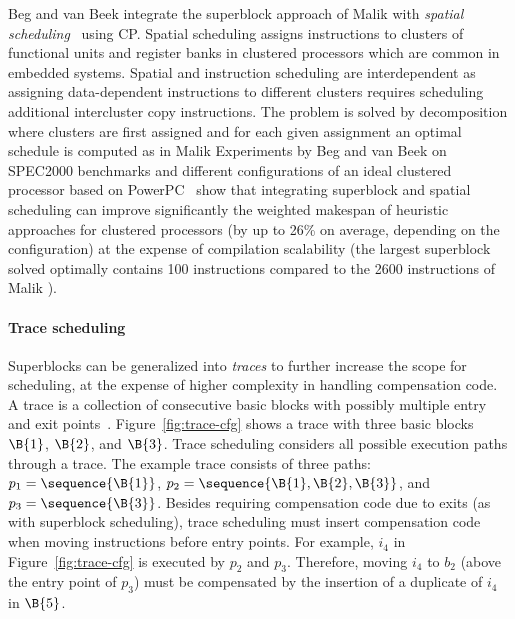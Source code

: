 \documentclass[acmsmall,authorversion,nonacm]{acmart}
\begin{document}
Beg and van Beek integrate the superblock approach of Malik \etal{}
with \emph{spatial scheduling}~\cite{Beg2013} using CP.
Spatial scheduling assigns instructions to clusters of functional
units and register banks in clustered processors which are common in
embedded systems.
Spatial and instruction scheduling are interdependent as assigning
data-dependent instructions to different clusters requires scheduling
additional intercluster copy instructions.
The problem is solved by decomposition where clusters are first
assigned and for each given assignment an optimal schedule is computed
as in Malik \etal{}
Experiments by Beg and van Beek on SPEC2000 benchmarks and different
configurations of an ideal clustered processor based on
PowerPC~\cite{Diefendorff1994} show that integrating superblock and
spatial scheduling can improve significantly the weighted makespan of
heuristic approaches for clustered processors (by up to 26\% on
average, depending on the configuration) at the expense of compilation
scalability (the largest superblock solved optimally contains 100
instructions compared to the 2600 instructions of Malik \etal{}).

\paragraph{Trace scheduling}

Superblocks can be generalized into \emph{traces} to further increase
the scope for scheduling, at the expense of higher complexity in
handling compensation code.
A trace is a collection of consecutive basic blocks with possibly
multiple entry and exit points~\cite{Fisher1981}.
Figure~\ref{fig:trace-cfg} shows a trace with three basic blocks
$\B{1}$, $\B{2}$, and $\B{3}$.
Trace scheduling considers all possible execution paths through a
trace.
The example trace consists of three paths: $p_1 = \sequence{\B{1}}$,
$p_2 = \sequence{\B{1}, \B{2}, \B{3}}$, and $p_3 = \sequence{\B{3}}$.
Besides requiring compensation code due to exits (as with superblock
scheduling), trace scheduling must insert compensation code when
moving instructions before entry points.
For example, $i_4$ in Figure~\ref{fig:trace-cfg} is executed by $p_2$
and $p_3$.
Therefore, moving $i_4$ to $b_2$ (above the entry point of $p_3$) must
be compensated by the insertion of a duplicate of $i_4$ in $\B{5}$.
\end{document}
